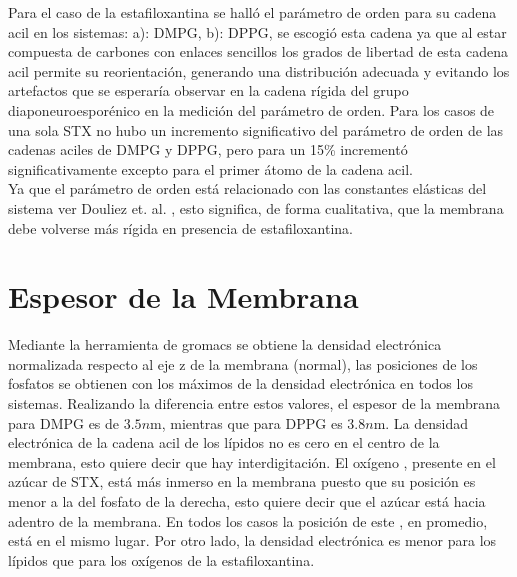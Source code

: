 Para el caso de la estafiloxantina se hall\'{o} el par\'{a}metro de orden para su cadena acil en los sistemas: a): DMPG, b): DPPG, se escogi\'{o} esta cadena ya que al estar compuesta de carbones con enlaces sencillos los grados de libertad de esta cadena acil permite su reorientaci\'{o}n, generando una distribuci\'{o}n adecuada y evitando los artefactos que se esperar\'{i}a observar en la cadena r\'{i}gida del grupo diaponeuroespor\'{e}nico en la medici\'{o}n del par\'{a}metro de orden. Para los casos de una sola STX no hubo un incremento significativo del par\'{a}metro de orden de las cadenas aciles de DMPG y DPPG, pero para un 15\% increment\'{o} significativamente excepto para el primer \'{a}tomo de la cadena acil. \\ 

Ya que el par\'{a}metro de orden est\'{a} relacionado con las constantes el\'{a}sticas del sistema ver Douliez et. al. \cite{Douliez1998OnBiomembranes}, esto significa, de forma cualitativa, que la membrana debe volverse  m\'{a}s r\'{i}gida en presencia de estafiloxantina.\\

\section{Espesor de la Membrana}

Mediante la herramienta de gromacs se obtiene la densidad electr\'{o}nica normalizada respecto al eje z de la membrana (normal), las posiciones de los fosfatos se obtienen con los m\'{a}ximos de la densidad electr\'{o}nica en todos los sistemas. Realizando la diferencia entre estos valores, el espesor de la membrana para DMPG es de $3.5n$m, mientras que para DPPG es $3.8n$m. La densidad electr\'{o}nica de la cadena acil de los l\'{i}pidos no es cero en el centro de la membrana, esto quiere decir que hay interdigitaci\'{o}n. El ox\'{i}geno ,  presente en el az\'{u}car de STX, est\'{a} m\'{a}s inmerso en la membrana puesto que su posici\'{o}n es menor a la del fosfato de la derecha, esto quiere decir que el az\'{u}car est\'{a} hacia adentro de la membrana. En todos los casos la posici\'{o}n de este , en promedio, est\'{a} en el mismo lugar. Por otro lado, la densidad electr\'{o}nica es menor para los l\'{i}pidos que para los ox\'{i}genos  de la estafiloxantina.\\
